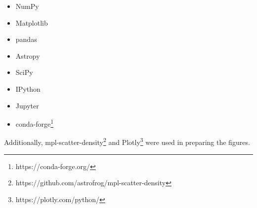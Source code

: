 \documentclass[twocolumn]{aastex63}
\begin{document}
\begin{itemize}
  \setlength\itemsep{-1mm}
	\item NumPy \citep{van_der_walt_numpy_2011}
	\item Matplotlib \citep{hunter_matplotlib_2007}
	\item pandas \citep{mckinney-proc-scipy-2010}
	\item Astropy \citep{astropy:2013}
	\item SciPy \citep{2020SciPy-NMeth}
	\item IPython \citep{perez_ipython_2007}
	\item Jupyter \citep{Kluyver:2016aa}
	\item conda-forge\footnote{https://conda-forge.org/}
\end{itemize}

 Additionally, mpl-scatter-density\footnote{https://github.com/astrofrog/mpl-scatter-density} and Plotly\footnote{https://plotly.com/python/} were used in preparing the figures.


{}

\end{document}
